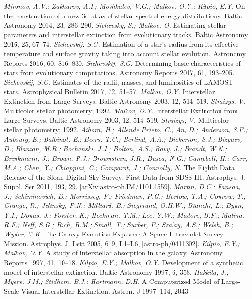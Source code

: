 \documentclass[12pt, a4paper]{article}
\begin{document}
\begin{thebibliography}{00}
    \textit{Mironov, A.V.; Zakharov, A.I.; Moshkalev, V.G.; Malkov, O.Y.; Kilpio, E.Y.} On the construction of a new 3d atlas of stellar spectral energy distributions. Baltic Astronomy 2014, 23, 286–290.
    \textit{Sichevsky, S.; Malkov, O.} Estimating stellar parameters and interstellar extinction from evolutionary tracks. Baltic Astronomy 2016, 25, 67–74.
    \textit{Sichevskij, S.G.} Estimation of a star’s radius from its effective temperature and surface gravity taking into account stellar evolution. Astronomy Reports 2016, 60, 816–830.
    \textit{Sichevskij, S.G.} Determining basic characteristics of stars from evolutionary computations. Astronomy Reports 2017, 61, 193–205.
    \textit{Sichevskij, S.G.} Estimates of the radii, masses, and luminosities of LAMOST stars. Astrophysical Bulletin 2017, 72, 51–57.
    \textit{Malkov, O.Y.} Interstellar Extinction from Large Surveys. Baltic Astronomy 2003, 12, 514–519.
    \textit{Straizys, V.} Multicolor stellar photometry; 1992.
	\textit{Malkov, O.Y.} Interstellar Extinction from Large Surveys. Baltic Astronomy 2003, 12, 514–519.
	\textit{Straizys, V.} Multicolor stellar photometry; 1992.
	\textit{Aihara, H.; Allende Prieto, C.; An, D.; Anderson, S.F.; Aubourg, E.; Balbinot, E.; Beers, T.C.; Berlind, A.A.; Bickerton, S.J.; Bizyaev, D.; Blanton, M.R.; Bochanski, J.J.; Bolton, A.S.; Bovy, J.; Brandt, W.N.; Brinkmann, J.; Brown, P.J.; Brownstein, J.R.; Busca, N.G.; Campbell, H.; Carr, M.A.; Chen, Y.; Chiappini, C.; Comparat, J.; Connolly, N.} The Eighth Data Release of the Sloan Digital Sky Survey: First Data from SDSS-III. Astrophys. J. Suppl. Ser 2011, 193, 29, [arXiv:astro-ph.IM/1101.1559].
	\textit{Martin, D.C.; Fanson, J.; Schiminovich, D.; Morrissey, P.; Friedman, P.G.; Barlow, T.A.; Conrow, T.; Grange, R.; Jelinsky, P.N.; Milliard, B.; Siegmund, O.H.W.; Bianchi, L.; Byun, Y.I.; Donas, J.; Forster, K.; Heckman, T.M.; Lee, Y.W.; Madore, B.F.; Malina, R.F.; Neff, S.G.; Rich, R.M.; Small, T.; Surber, F.; Szalay, A.S.; Welsh, B.; Wyder, T.K.} The Galaxy Evolution Explorer: A Space Ultraviolet Survey Mission. Astrophys. J. Lett 2005, 619, L1–L6, [astro-ph/0411302].
	\textit{Kilpio, E.Y.; Malkov, O.Y.} A study of interstellar absorption in the galaxy. Astronomy Reports 1997, 41, 10–18.
	\textit{Kilpio, E.Y.; Malkov, O.Y.} Development of a synthetic model of interstellar extinction. Baltic Astronomy 1997, 6, 358.
	\textit{Hakkila, J.; Myers, J.M.; Stidham, B.J.; Hartmann, D.H.} A Computerized Model of Large-Scale Visual Interstellar Extinction. Astron. J 1997, 114, 2043.

\end{thebibliography}
\end{document}
